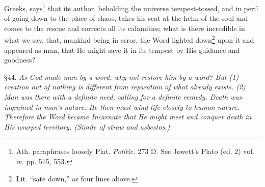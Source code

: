 Greeks, says\footnote{Ath. paraphrases loosely Plat. \emph{Politic.} 273 D. See Jowett’s Plato (ed. 2) vol. iv. pp. 515, 553.} that its author, beholding the universe tempest-tossed, and in peril of going down to the place of chaos, takes his seat at the helm of the soul and comes to the rescue and corrects all its calamities; what is there incredible in what we say, that, mankind being in error, the Word lighted down\footnote{Lit. “sate down,” as four lines above.} upon it and appeared as man, that He might save it in its tempest by His guidance and goodness?


§44. \emph{As God made man by a word, why not restore him by a word? But (1) creation out of nothing is different from reparation of what already exists. (2) Man was there with a definite need, calling for a definite remedy. Death was ingrained in man’s nature: He then must wind life closely to human nature. Therefore the Word became Incarnate that He might meet and conquer death in His usurped territory. (Simile of straw and asbestos.)}

